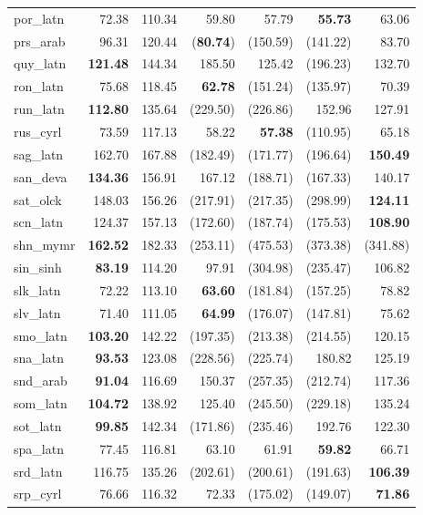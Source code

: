 \documentclass[11pt]{article}
\begin{document}
\begin{center}
\begin{longtable}[width=0.9\textwidth]{|l|rrrrrr|}
por\_latn & 72.38 & 110.34 & 59.80 & 57.79 & \textbf{55.73} & 63.06 \\ 
prs\_arab & 96.31 & 120.44 & (\textbf{80.74}) & (150.59) & (141.22) & 83.70 \\ 
quy\_latn & \textbf{121.48} & 144.34 & 185.50 & 125.42 & (196.23) & 132.70 \\ 
ron\_latn & 75.68 & 118.45 & \textbf{62.78} & (151.24) & (135.97) & 70.39 \\ 
run\_latn & \textbf{112.80} & 135.64 & (229.50) & (226.86) & 152.96 & 127.91 \\ 
rus\_cyrl & 73.59 & 117.13 & 58.22 & \textbf{57.38} & (110.95) & 65.18 \\ 
sag\_latn & 162.70 & 167.88 & (182.49) & (171.77) & (196.64) & \textbf{150.49} \\ 
san\_deva & \textbf{134.36} & 156.91 & 167.12 & (188.71) & (167.33) & 140.17 \\ 
sat\_olck & 148.03 & 156.26 & (217.91) & (217.35) & (298.99) & \textbf{124.11} \\ 
scn\_latn & 124.37 & 157.13 & (172.60) & (187.74) & (175.53) & \textbf{108.90} \\ 
shn\_mymr & \textbf{162.52} & 182.33 & (253.11) & (475.53) & (373.38) & (341.88) \\ 
sin\_sinh & \textbf{83.19} & 114.20 & 97.91 & (304.98) & (235.47) & 106.82 \\ 
slk\_latn & 72.22 & 113.10 & \textbf{63.60} & (181.84) & (157.25) & 78.82 \\ 
slv\_latn & 71.40 & 111.05 & \textbf{64.99} & (176.07) & (147.81) & 75.62 \\ 
smo\_latn & \textbf{103.20} & 142.22 & (197.35) & (213.38) & (214.55) & 120.15 \\ 
sna\_latn & \textbf{93.53} & 123.08 & (228.56) & (225.74) & 180.82 & 125.19 \\ 
snd\_arab & \textbf{91.04} & 116.69 & 150.37 & (257.35) & (212.74) & 117.36 \\ 
som\_latn & \textbf{104.72} & 138.92 & 125.40 & (245.50) & (229.18) & 135.24 \\ 
sot\_latn & \textbf{99.85} & 142.34 & (171.86) & (235.46) & 192.76 & 122.30 \\ 
spa\_latn & 77.45 & 116.81 & 63.10 & 61.91 & \textbf{59.82} & 66.71 \\ 
srd\_latn & 116.75 & 135.26 & (202.61) & (200.61) & (191.63) & \textbf{106.39} \\ 
srp\_cyrl & 76.66 & 116.32 & 72.33 & (175.02) & (149.07) & \textbf{71.86} \\ 

\end{longtable}
\end{center}
\end{document}

